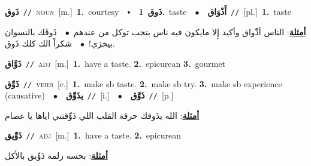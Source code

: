 \documentclass[10pt,a4paper,twoside]{article} %
\begin{document}
\begin{multicols}{2}
{{{{{{{{{\setlength\topsep{0pt}\textbf{\foreignlanguage{arabic}{ذَوق}}\ {\color{gray}\texttt{//}\color{black}}\ \textsc{noun}\ [m.]\ \textbf{1.}~courtesy\ \ $\smblkdiamond$\ \ \setlength\topsep{0pt}\textbf{\foreignlanguage{arabic}{ذَوق}}\ \textbf{1.}~taste\ \ $\bullet$\ \ \setlength\topsep{0pt}\textbf{\foreignlanguage{arabic}{أَذْوَاق}}\ {\color{gray}\texttt{//}\color{black}}\ [pl.]\ \textbf{1.}~taste\  \begin{flushright}\color{gray}\foreignlanguage{arabic}{\textbf{\underline{\foreignlanguage{arabic}{أمثلة}}}: الناس أذْْواق وأكيد إِلا مايكون فيه ناس بتحب توكل من عندهم\ $\bullet$\ \  ذَوقَك بالنسوان بيخزي!\ $\bullet$\ \  شكراً الك كلك ذَوق.}\end{flushright}\color{black}} \vspace{2mm}

{\setlength\topsep{0pt}\textbf{\foreignlanguage{arabic}{ذَوَّاق}}\ {\color{gray}\texttt{//}\color{black}}\ \textsc{adj}\ [m.]\ \textbf{1.}~have a taste.  \textbf{2.}~epicurean  \textbf{3.}~gourmet\ 

{\setlength\topsep{0pt}\textbf{\foreignlanguage{arabic}{ذَوِّق}}\ {\color{gray}\texttt{//}\color{black}}\ \textsc{verb}\ [c.]\ \textbf{1.}~make sb taste.  \textbf{2.}~make sb try.  \textbf{3.}~make sb experience (causative)\ \ $\bullet$\ \ \setlength\topsep{0pt}\textbf{\foreignlanguage{arabic}{يذَوِّق}}\ {\color{gray}\texttt{//}\color{black}}\ [i.]\ \ $\bullet$\ \ \setlength\topsep{0pt}\textbf{\foreignlanguage{arabic}{ذَوَّق}}\ {\color{gray}\texttt{//}\color{black}}\ [p.]\  \begin{flushright}\color{gray}\foreignlanguage{arabic}{\textbf{\underline{\foreignlanguage{arabic}{أمثلة}}}: الله يذَوقك حرقة القلب اللي ذَوِّقتني اياها يا عصام}\end{flushright}\color{black}} \vspace{2mm}

{\setlength\topsep{0pt}\textbf{\foreignlanguage{arabic}{ذَوِّيق}}\ {\color{gray}\texttt{//}\color{black}}\ \textsc{adj}\ [m.]\ \textbf{1.}~have a taste.  \textbf{2.}~epicurean\  \begin{flushright}\color{gray}\foreignlanguage{arabic}{\textbf{\underline{\foreignlanguage{arabic}{أمثلة}}}: بحسه زلمة ذَوِّيق بالأكل}\end{flushright}\color{black}} \vspace{2mm}

}}}}}}}}}
\end{multicols}
\end{document}
